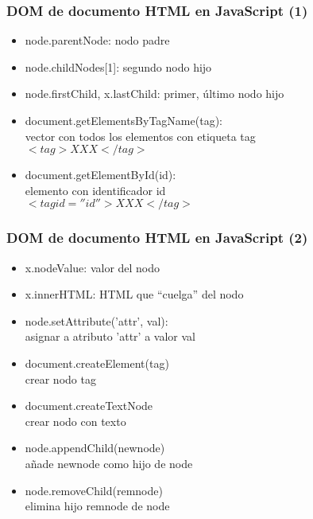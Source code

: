 
\begin{frame}
\frametitle{DOM de documento HTML en JavaScript (1)}

\begin{itemize}
\item node.parentNode: nodo padre
\item node.childNodes[1]: segundo nodo hijo
\item node.firstChild, x.lastChild: primer, último nodo hijo
\item document.getElementsByTagName(tag): \\
  vector con todos los elementos con etiqueta tag \\
  $<tag>XXX</tag>$
\item document.getElementById(id): \\
  elemento con identificador id \\
  $<tag id=''id''>XXX</tag>$
\end{itemize}
\end{frame}


\begin{frame}
\frametitle{DOM de documento HTML en JavaScript (2)}

\begin{itemize}
\item x.nodeValue: valor del nodo
\item x.innerHTML: HTML que ``cuelga'' del nodo
\item node.setAttribute('attr', val): \\
  asignar a atributo 'attr' a valor val
\item document.createElement(tag) \\
  crear nodo tag
\item document.createTextNode \\
  crear nodo con texto
\item node.appendChild(newnode) \\
  añade newnode como hijo de node
\item node.removeChild(remnode) \\
  elimina hijo remnode de node
\end{itemize}

\end{frame}


